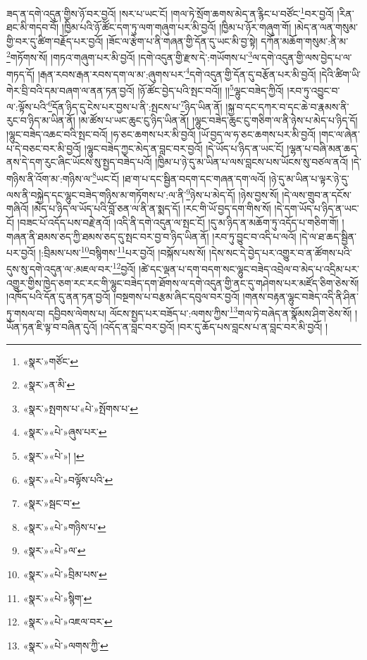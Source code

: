 ཟད་ན་དགེ་འདུན་གྱིས་ཉོ་བར་བྱའོ། །སར་པ་ཡང་ངོ། །གལ་ཏེ་སྲོག་ཆགས་མེད་ན་རྙིང་པ་བཙོང་\footnote{«སྣར་»གཙོང་}བར་བྱའོ། །རིན་ཐང་མི་གདབ་བོ། །ཁྱིམ་པའི་ཉོ་ཚོང་དག་ཏུ་ལག་གཞུག་པར་མི་བྱའོ། །ཁྱིམ་པ་ཉོར་གཞུག་གོ། །མེད་ན་ལན་གསུམ་གྱི་བར་དུ་ཚིག་བརྗོད་པར་བྱའོ། །ཟོང་ལ་རྩེག་པ་ནི་གཞན་གྱི་དོན་དུ་ཡང་མི་བྱ་སྟེ། དཀོན་མཆོག་གསུམ་:ནི་མ་\footnote{«སྣར་»ན་མི་}གཏོགས་སོ། །གཏའ་གཞུག་པར་མི་བྱའོ། །དགེ་འདུན་གྱི་རྫས་དེ་:གཡོགས་པ་\footnote{«སྣར་»སྤགས་པ་«པེ་»སྤོགས་པ་}ལ་དགེ་འདུན་གྱི་ལས་བྱེད་པ་ལ་གཏད་དོ། །རྒན་རབས་རྒན་རབས་དག་ལ་མ་:ཞུགས་པར་\footnote{«སྣར་»«པེ་»ཞུས་པར་}དགེ་འདུན་གྱི་དོན་དུ་བརྩོན་པར་མི་བྱའོ། །དེའི་ཚིག་ཡི་གེར་བྲི་བའི་དམ་བཞག་ལ་ནན་ཏན་བྱའོ། །ཉོ་ཚོང་བྱེད་པའི་སྤང་བའོ།། །།\footnote{«སྣར་»«པེ་»། །}ལྷུང་བཟེད་ཀྱིའོ། །རབ་ཏུ་འབྱུང་བ་ལ་:ལྟོས་པའི་\footnote{«སྣར་»«པེ་»བལྟོས་པའི་}དོན་ཉིད་དུ་ངེས་པར་བྱས་པ་ནི་:སྤངས་པ་\footnote{«སྣར་»སྦང་བ་}ཉིད་ཡིན་ནོ། །སྐྱ་བ་དང་དཀར་བ་དང་ཆེ་བ་རྣམས་ནི་རུང་བ་ཉིད་མ་ཡིན་ནོ། །མ་ཚོས་པ་ཡང་ཆུང་ངུ་ཉིད་ཡིན་ནོ། །ལྷུང་བཟེད་ཆུང་ངུ་གཅིག་ལ་ནི་ཉེས་པ་མེད་པ་ཉིད་དོ། །ལྷུང་བཟེད་འཆང་བའི་སྤང་བའོ། །ཧ་ཅང་ཆགས་པར་མི་བྱའོ། །ཡོ་བྱད་ལ་ཧ་ཅང་ཆགས་པར་མི་བྱའོ། །གང་ལ་ཞེན་པ་དེ་བཅང་བར་མི་བྱའོ། །ལྷུང་བཟེད་ཀྱང་མེད་ན་བླང་བར་བྱའོ། །དེ་ཡོད་པ་ཉིད་ན་ཡང་ངོ། །ལྷན་པ་བཞི་མན་ཆད་ནས་དེ་དག་རུང་ཞིང་ཡོངས་སུ་སྤྱད་བཟེད་པའོ། །ཁྱིམ་པ་ཉེ་དུ་མ་ཡིན་པ་ལས་བླངས་པས་ཡོངས་སུ་བཙལ་ནའོ། །དེ་གཉིས་ནི་འོག་མ་:གཉིས་ལ་\footnote{«སྣར་»«པེ་»གཉིས་པ་}ཡང་ངོ། །ཐ་ག་པ་དང་སྦྱིན་བདག་དང་གཞན་དག་ལའོ། །ཉེ་དུ་མ་ཡིན་པ་ལྟར་ཉེ་དུ་ལས་ནི་བསྐྱེད་དང་ལྷུང་བཟེད་གཉིས་མ་གཏོགས་པ་:ལ་ནི་\footnote{«སྣར་»«པེ་»ལ་}ཉེས་པ་མེད་དོ། །ཉེས་བྱས་སོ། །དེ་ལས་གྲུབ་ན་དངོས་གཞིའོ། །མེད་པ་ཉིད་ལ་ཡོད་པའི་བློ་ཅན་ལ་ནི་ན་སྨད་དོ། །རང་གི་ཡོ་བྱད་དག་གིས་སོ། །དེ་དག་ཡོད་པ་ཉིད་ན་ཡང་ངོ། །བཟང་པོ་འདོད་པས་བརྗེ་ནའོ། །འདི་ནི་དགེ་འདུན་ལ་སྤང་ངོ། །དུ་མ་ཉིད་ན་མཆོག་ཏུ་འདོད་པ་གཅིག་གོ། །གཞན་ནི་ཐམས་ཅད་ཀྱི་ཐམས་ཅད་དུ་སྤང་བར་བྱ་བ་ཉིད་ཡིན་ནོ། །རབ་ཏུ་བྱུང་བ་འདི་པ་ལའོ། །དེ་ལ་ཐ་ཆད་སྦྱིན་པར་བྱའོ། །:བྲིམས་པས་\footnote{«སྣར་»«པེ་»བྲིམ་པས་}བསྙིགས་\footnote{«སྣར་»«པེ་»སྙིག་}པར་བྱའོ། །བསྐོས་པས་སོ། །དེས་སང་དེ་བྱེད་པར་འགྱུར་བ་ན་ཚོགས་པའི་དུས་སུ་དགེ་འདུན་ལ་:མཇལ་བར་\footnote{«སྣར་»«པེ་»འཇལ་བར་}བྱའོ། །ཚེ་དང་ལྡན་པ་དག་བདག་སང་ལྷུང་བཟེད་འབྲེལ་བ་མེད་པ་འདྲིམ་པར་འགྱུར་གྱིས་ཁྱེད་ཅག་རང་རང་གི་ལྷུང་བཟེད་དག་ཐོགས་ལ་དགེ་འདུན་གྱི་ནང་དུ་གཤེགས་པར་མཛོད་ཅིག་ཅེས་སོ། །འཁོད་པའི་དོན་དུ་ནན་ཏན་བྱའོ། །བསྔགས་པ་བརྩམ་ཞིང་དབུལ་བར་བྱའོ། །གནས་བརྟན་ལྷུང་བཟེད་འདི་ནི་ཤིན་ཏུ་གསལ་བ། དབྱིབས་ལེགས་པ། ལོངས་སྤྱད་པར་བཟོད་པ་:ལགས་ཀྱིས་\footnote{«སྣར་»«པེ་»ལགས་ཀྱི་}གལ་ཏེ་བཞེད་ན་སྣོམས་ཤིག་ཅེས་སོ། །ཡོན་ཏན་ཇི་ལྟ་བ་བཞིན་དུའོ། །འདོད་ན་བླང་བར་བྱའོ། །བར་དུ་ཆོད་པས་བླངས་པ་ན་བླང་བར་མི་བྱའོ། །
